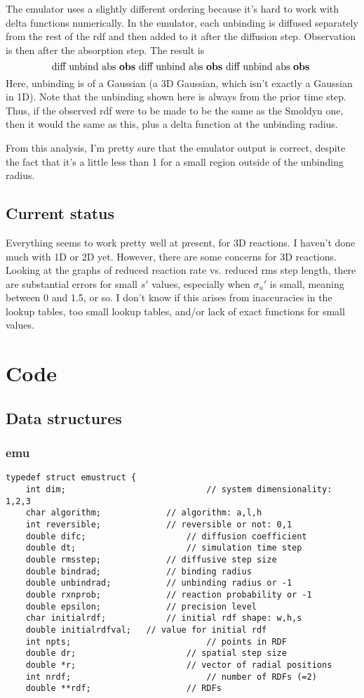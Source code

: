 \documentclass {book}
\begin{document}
The emulator uses a slightly different ordering because it's hard to work with delta functions numerically. In the emulator, each unbinding is diffused separately from the rest of the rdf and then added to it after the diffusion step. Observation is then after the absorption step. The result is
$$\textrm{diff unbind abs \textbf{obs} diff unbind abs \textbf{obs} diff unbind abs \textbf{obs} }$$
Here, unbinding is of a Gaussian (a 3D Gaussian, which isn't exactly a Gaussian in 1D). Note that the unbinding shown here is always from the prior time step. Thus, if the observed rdf were to be made to be the same as the Smoldyn one, then it would the same as this, plus a delta function at the unbinding radius.

From this analysis, I'm pretty sure that the emulator output is correct, despite the fact that it's a little less than 1 for a small region outside of the unbinding radius.

\section{Current status}

Everything seems to work pretty well at present, for 3D reactions. I haven't done much with 1D or 2D yet. However, there are some concerns for 3D reactions. Looking at the graphs of reduced reaction rate vs. reduced rms step length, there are substantial errors for small $s'$ values, especially when $\sigma_u'$ is small, meaning between 0 and 1.5, or so. I don't know if this arises from inaccuracies in the lookup tables, too small lookup tables, and/or lack of exact functions for small values.


\chapter{Code}

\section{Data structures}

\subsection{emu}

\begin{lstlisting}
typedef struct emustruct {
	int dim;							// system dimensionality: 1,2,3
	char algorithm;				// algorithm: a,l,h
	int reversible;				// reversible or not: 0,1
	double difc;					// diffusion coefficient
	double dt;						// simulation time step
	double rmsstep;				// diffusive step size
	double bindrad;				// binding radius
	double unbindrad;			// unbinding radius or -1
	double rxnprob;				// reaction probability or -1
	double epsilon;				// precision level
	char initialrdf;			// initial rdf shape: w,h,s
	double initialrdfval;	// value for initial rdf
	int npts;							// points in RDF
	double dr;						// spatial step size
	double *r;						// vector of radial positions
	int nrdf;							// number of RDFs (=2)
	double **rdf;					// RDFs
\end{lstlisting}
\end{document}
